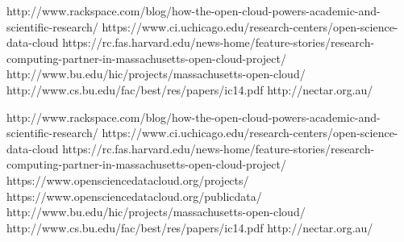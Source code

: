 http://www.rackspace.com/blog/how-the-open-cloud-powers-academic-and-scientific-research/
https://www.ci.uchicago.edu/research-centers/open-science-data-cloud
https://rc.fas.harvard.edu/news-home/feature-stories/research-computing-partner-in-massachusetts-open-cloud-project/
http://www.bu.edu/hic/projects/massachusetts-open-cloud/
http://www.cs.bu.edu/fac/best/res/papers/ic14.pdf
http://nectar.org.au/

http://www.rackspace.com/blog/how-the-open-cloud-powers-academic-and-scientific-research/
https://www.ci.uchicago.edu/research-centers/open-science-data-cloud
https://rc.fas.harvard.edu/news-home/feature-stories/research-computing-partner-in-massachusetts-open-cloud-project/
https://www.opensciencedatacloud.org/projects/
https://www.opensciencedatacloud.org/publicdata/
http://www.bu.edu/hic/projects/massachusetts-open-cloud/
http://www.cs.bu.edu/fac/best/res/papers/ic14.pdf
http://nectar.org.au/

